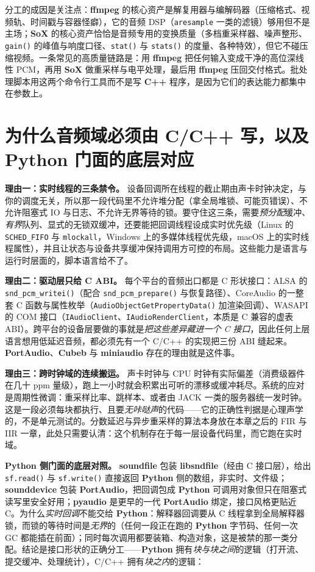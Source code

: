 \documentclass[12pt,a4paper,fontset=fandol]{ctexbook}
\newcommand{\Fn}[1]{\texttt{#1()}}
\newcommand{\Tp}[1]{\texttt{#1}}
\newcommand{\Bk}{\allowbreak}
\newcommand{\Lib}[1]{\textbf{#1}}
\newcommand{\Lang}[1]{\textsf{\bfseries #1}}
\newcommand{\CPP}{\Lang{C++}}
\newcommand{\PY}{\Lang{Python}}
\begin{document}
分工的成因是关注点：\Lib{ffmpeg} 的核心资产是解复用器与编解码器（压缩格式、视频轨、时间戳与容器怪癖），它的音频 DSP（\Tp{aresample} 一类的滤镜）够用但不是主场；\Lib{SoX} 的核心资产恰恰是音频专用的变换质量（多档重采样器、噪声整形、\Fn{gain} 的峰值与响度口径、\Fn{stat} 与 \Fn{stats} 的度量、各种特效），但它不碰压缩视频。一条常见的高质量链路是：用 \Lib{ffmpeg} 把任何输入变成干净的高位深线性 PCM，再用 \Lib{SoX} 做重采样与电平处理，最后用 \Lib{ffmpeg} 压回交付格式。批处理脚本用这两个命令行工具而不是写 \CPP{} 程序，是因为它们的表达能力都集中在参数上。

\section{为什么音频域必须由 C/C++ 写，以及 \PY{} 门面的底层对应}

\textbf{理由一：实时线程的三条禁令。} 设备回调所在线程的截止期由声卡时钟决定，与你的调度无关，所以那一段代码里不允许堆分配（拿全局堆锁、可能页错误）、不允许阻塞式 IO 与日志、不允许无界等待的锁。要守住这三条，需要\emph{预分配}缓冲、\emph{有界}队列、显式的无锁双缓冲，还要能把回调线程设成实时优先级（Linux 的 \Tp{SCHED\_FIFO} 与 \Tp{mlockall}，Windows 上的多媒体线程优先级，macOS 上的实时线程属性），并且让状态与设备共享缓冲保持调用方可控的布局。这些能力是语言与运行时层面的，脚本语言给不了。

\textbf{理由二：驱动层只给 C ABI。} 每个平台的音频出口都是 C 形状接口：ALSA 的 \Fn{snd\_\Bk pcm\_\Bk writei}（配合 \Fn{snd\_\Bk pcm\_\Bk prepare} 与恢复路径）、CoreAudio 的一整套 C 函数与属性枚举（\Fn{Audio\Bk Object\Bk Get\Bk Property\Bk Data} 加渲染回调）、WASAPI 的 COM 接口（\Tp{IAudioClient}、\Tp{IAudioRenderClient}，本质是 C 兼容的虚表 ABI）。跨平台的设备层要做的事就是\emph{把这些差异藏进一个 C 接口}，因此任何上层语言想用低延迟音频，都必须先有一个 C/C++ 的实现把三份 ABI 缝起来。\Lib{PortAudio}、\Lib{Cubeb} 与 \Lib{miniaudio} 存在的理由就是这件事。

\textbf{理由三：跨时钟域的连续搬运。} 声卡时钟与 CPU 时钟有实际偏差（消费级器件在几十 ppm 量级），跑上一小时就会积累出可听的漂移或缓冲耗尽。系统的应对是周期性微调：重采样比率、跳样本、或者由 JACK 一类的服务器统一发时钟。这是一段必须每块都执行、且要\emph{无咔哒声}的代码——它的正确性判据是心理声学的，不是单元测试的。分数延迟与异步重采样的算法本身放在本章之后的 FIR 与 IIR 一章，此处只需要认清：这个机制存在于每一层设备代码里，而它跑在实时域。

\textbf{\PY{} 侧门面的底层对照。} \Lib{soundfile} 包装 \Lib{libsndfile}（经由 C 接口层），给出 \Fn{sf.read} 与 \Fn{sf.write} 直接返回 \PY{} 侧的数组，非实时、文件级；\Lib{sounddevice} 包装 \Lib{PortAudio}，把回调包成 \PY{} 可调用对象但只在阻塞式读写里安全好用；\Lib{pyaudio} 是更早的一代 \Lib{PortAudio} 绑定，接口风格更贴近 C。为什么\emph{实时回调}不能交给 \PY{}：解释器回调要从 C 线程拿到全局解释器锁，而锁的等待时间是\emph{无界}的（任何一段正在跑的 \PY{} 字节码、任何一次 GC 都能插在前面）；同时每次调用都要装箱、构造对象，这是被禁的那一类分配。结论是接口形状的正确分工——\PY{} 拥有\emph{块与块之间}的逻辑（打开流、提交缓冲、处理统计），C/C++ 拥有\emph{块之内}的逻辑：
\end{document}
